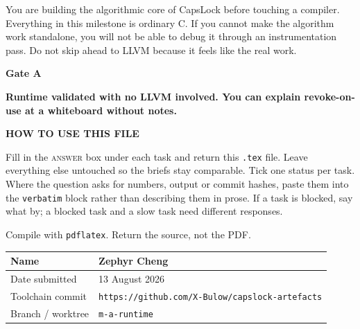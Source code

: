 \documentclass[11pt,a4paper]{article}
\begin{document}
\thispagestyle{fancy}

\par\vspace{2pt}
\par\vspace{8pt}

\begin{notebox}
You are building the algorithmic core of CapsLock before touching a compiler. Everything in this milestone is ordinary C. If you cannot make the algorithm work standalone, you will not be able to debug it through an instrumentation pass. Do not skip ahead to LLVM because it feels like the real work.
\end{notebox}

\begin{gatebox}
{\scriptsize\bfseries\color{mute}Gate A}\par\vspace{2pt}
{\bfseries Runtime validated with no LLVM involved. You can explain revoke-on-use at a whiteboard without notes.}
\end{gatebox}

\begin{notebox}
{\scriptsize\bfseries\color{mute}HOW TO USE THIS FILE}\par\vspace{3pt}
Fill in the \textsc{answer} box under each task and return this \texttt{.tex} file. Leave everything
else untouched so the briefs stay comparable. Tick one status per task. Where the question asks for
numbers, output or commit hashes, paste them into the \texttt{verbatim} block rather than describing
them in prose. If a task is blocked, say what by; a blocked task and a slow task need different
responses.\par\vspace{4pt}
{\scriptsize\color{mute}Compile with \texttt{pdflatex}. Return the source, not the PDF.}
\end{notebox}

\vspace{4pt}
\noindent\begin{tabular}{@{}p{34mm}p{120mm}@{}}
\hline
{\footnotesize\color{mute}Name} & \rule{0pt}{4.4mm}Zephyr Cheng \\
\hline
{\footnotesize\color{mute}Date submitted} & \rule{0pt}{4.4mm}13 August 2026 \\
\hline
{\footnotesize\color{mute}Toolchain commit} & \rule{0pt}{4.4mm}\texttt{https://github.com/X-Bulow/capslock-artefacts} \\
\hline
{\footnotesize\color{mute}Branch / worktree} & \rule{0pt}{4.4mm}\texttt{m-a-runtime} \\
\hline
\end{tabular}
\end{document}
